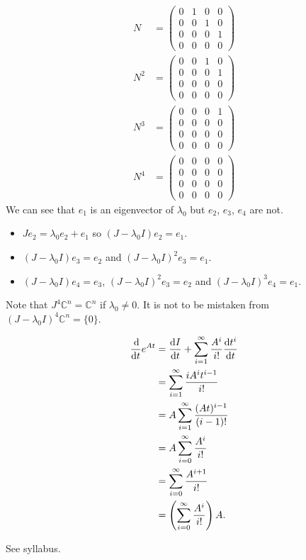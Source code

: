 \begin{solution}
  \begin{align*}
    N & =
    \begin{pmatrix}
      0 & 1 & 0 & 0\\
      0 & 0 & 1 & 0\\
      0 & 0 & 0 & 1\\
      0 & 0 & 0 & 0
    \end{pmatrix}\\
    N^2 & =
    \begin{pmatrix}
      0 & 0 & 1 & 0\\
      0 & 0 & 0 & 1\\
      0 & 0 & 0 & 0\\
      0 & 0 & 0 & 0
    \end{pmatrix}\\
    N^3 & =
    \begin{pmatrix}
      0 & 0 & 0 & 1\\
      0 & 0 & 0 & 0\\
      0 & 0 & 0 & 0\\
      0 & 0 & 0 & 0
    \end{pmatrix}\\
    N^4 & =
    \begin{pmatrix}
      0 & 0 & 0 & 0\\
      0 & 0 & 0 & 0\\
      0 & 0 & 0 & 0\\
      0 & 0 & 0 & 0
    \end{pmatrix}
  \end{align*}
  We can see that $e_1$ is an eigenvector of $\lambda_0$ but
  $e_2$, $e_3$, $e_4$ are not.
  \begin{itemize}
    \item $Je_2 = \lambda_0 e_2 + e_1$
      so $(J - \lambda_0 I)e_2 = e_1$.
    \item $(J - \lambda_0 I)e_3 = e_2$ and $(J - \lambda_0 I)^2e_3 = e_1$.
    \item $(J - \lambda_0 I)e_4 = e_3$, $(J - \lambda_0 I)^2e_3 = e_2$
      and $(J - \lambda_0 I)^3e_4 = e_1$.
  \end{itemize}

  Note that $J^4 \mathbb{C}^n = \mathbb{C}^n$ if $\lambda_0 \neq 0$.
  It is not to be mistaken from $(J - \lambda_0 I)^4 \mathbb{C}^n = \{0\}$.
\end{solution}

\begin{solution}
  \begin{align*}
    \frac{\operatorname{d}\! }{\operatorname{d}\! t}e^{At}
    & = \frac{\operatorname{d}\! I}{\operatorname{d}\! t} + \sum_{i=1}^\infty \frac{A^i}{i!} \frac{\operatorname{d}\! t^i}{\operatorname{d}\! t}\\
    & = \sum_{i=1}^\infty \frac{iA^it^{i-1}}{i!}\\
    & = A\sum_{i=1}^\infty \frac{(At)^{i-1}}{(i-1)!}\\
    & = A\sum_{i=0}^\infty \frac{A^i}{i!}\\
    & = \sum_{i=0}^\infty \frac{A^{i+1}}{i!}\\
    & = \left(\sum_{i=0}^\infty \frac{A^i}{i!}\right)A.
  \end{align*}
\end{solution}

\begin{solution}
  See syllabus.
\end{solution}
